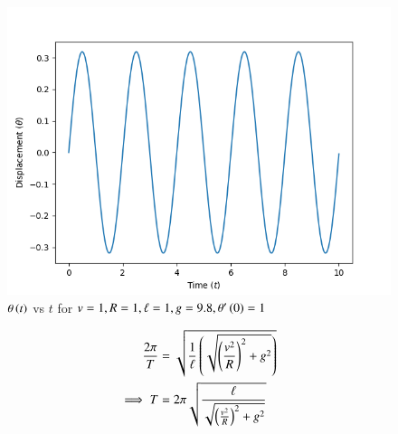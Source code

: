 \documentclass[journal,12pt,twocolumn]{IEEEtran}
\theoremstyle{remark}
\begin{document}
\begin{figure}[h!]
\centering
\includegraphics[width=\columnwidth]{ncert-physics/11/14/17/figs/plot.png}
\caption{$\theta\left(t\right)$ vs $t$ for $v = 1, R = 1, \ell = 1, g = 9.8, \theta'\left(0\right) = 1$}
\label{fig:analog_11_14_17_2}
\end{figure}
\begin{align}
\frac{2\pi}{T} &= \sqrt{\frac{1}{\ell}\left(\sqrt{\left(\frac{v^2}{R}\right)^2+g^2}\right)} \\
\implies T &= 2\pi\sqrt{\frac{\ell}{\sqrt{\left(\frac{v^2}{R}\right)^2+g^2}}}
\end{align}
\end{document}
